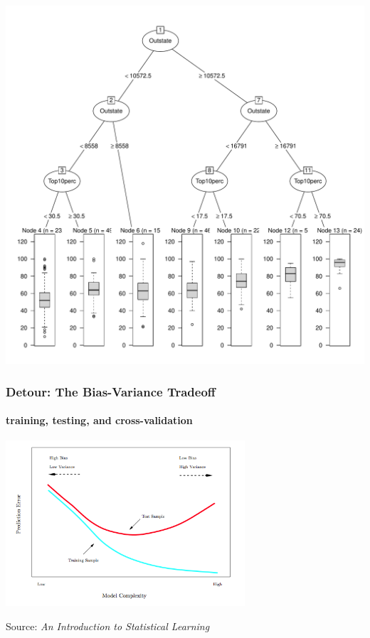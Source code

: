 \documentclass{beamer}\usepackage[]{graphicx}\usepackage[]{color}
\makeatletter
\def\maxwidth{ %
  \ifdim\Gin@nat@width>\linewidth
    \linewidth
  \else
    \Gin@nat@width
  \fi
}
\newenvironment{knitrout}{}{} %
\makeatother
\begin{document}
\begin{frame}
\begin{multicols}{2}
\begin{center}
\begin{knitrout}
\color{fgcolor}
\includegraphics[width=\maxwidth]{figure/grad_rate_rpart_tree-1} 

\end{knitrout}

\end{center}

\end{multicols}

\end{frame}


\begin{frame}
\frametitle{Detour: The Bias-Variance Tradeoff}
\framesubtitle{training, testing, and cross-validation}

\begin{center}
\includegraphics[width = 3.5in]{figure/bias_variance_tradeoff.png}
\end{center}
\scriptsize Source: \textit{An Introduction to Statistical Learning}

\end{frame}
\end{document}
